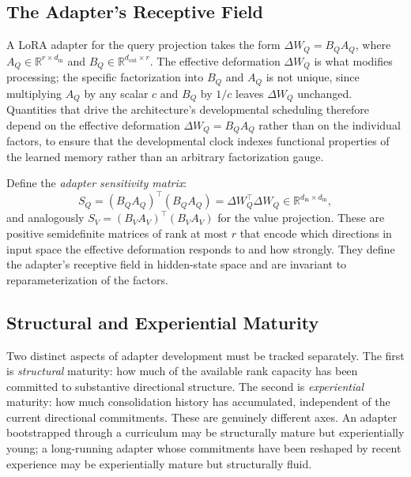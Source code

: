 \documentclass[11pt]{article}
\newcommand{\R}{\mathbb{R}}
\begin{document}
\subsection{The Adapter's Receptive Field}

A LoRA adapter for the query projection takes the form $\Delta W_Q = B_Q A_Q$, where $A_Q \in \R^{r \times d_\text{in}}$ and $B_Q \in \R^{d_\text{out} \times r}$. The effective deformation $\Delta W_Q$ is what modifies processing; the specific factorization into $B_Q$ and $A_Q$ is not unique, since multiplying $A_Q$ by any scalar $c$ and $B_Q$ by $1/c$ leaves $\Delta W_Q$ unchanged. Quantities that drive the architecture's developmental scheduling therefore depend on the effective deformation $\Delta W_Q = B_Q A_Q$ rather than on the individual factors, to ensure that the developmental clock indexes functional properties of the learned memory rather than an arbitrary factorization gauge.

Define the \emph{adapter sensitivity matrix}:
\begin{equation}
    S_Q = (B_Q A_Q)^\top (B_Q A_Q) = \Delta W_Q^\top \Delta W_Q \in \R^{d_\text{in} \times d_\text{in}},
\end{equation}
and analogously $S_V = (B_V A_V)^\top (B_V A_V)$ for the value projection. These are positive semidefinite matrices of rank at most $r$ that encode which directions in input space the effective deformation responds to and how strongly. They define the adapter's receptive field in hidden-state space and are invariant to reparameterization of the factors.

\subsection{Structural and Experiential Maturity}

Two distinct aspects of adapter development must be tracked separately. The first is \emph{structural} maturity: how much of the available rank capacity has been committed to substantive directional structure. The second is \emph{experiential} maturity: how much consolidation history has accumulated, independent of the current directional commitments. These are genuinely different axes. An adapter bootstrapped through a curriculum may be structurally mature but experientially young; a long-running adapter whose commitments have been reshaped by recent experience may be experientially mature but structurally fluid.
\end{document}
